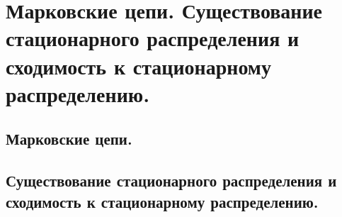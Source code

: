 \section{Марковские цепи. Существование стационарного распределения и сходимость к стационарному распределению.}

\subsection{Марковские цепи.}

\subsection{Существование стационарного распределения и сходимость к стационарному распределению.}